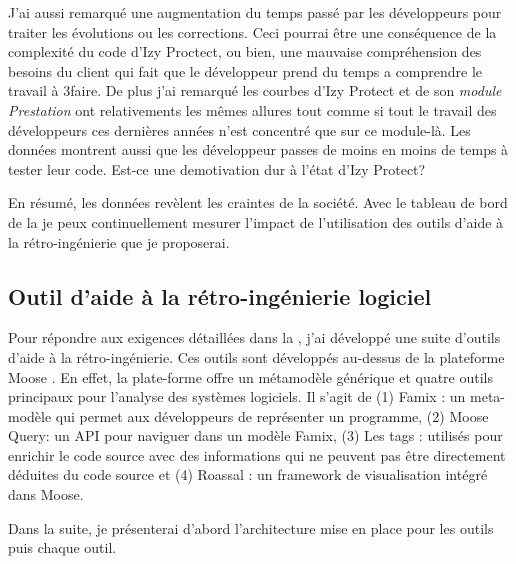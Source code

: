 \documentclass[a4paper]{article}
\begin{document}
J'ai aussi remarqué une augmentation du temps passé par les développeurs pour traiter les évolutions ou les corrections.
Ceci pourrai être une conséquence de la complexité du code d'Izy Proctect, ou bien, une mauvaise compréhension des besoins du client qui fait que le développeur prend du temps a comprendre le travail à 3faire.
De plus j'ai remarqué les courbes d'Izy Protect et de  son \textit{module Prestation} ont relativements les mêmes allures tout comme si tout le travail des développeurs ces dernières années n'est concentré que sur ce module-là.  
Les données montrent aussi que les développeur passes de moins en moins de temps à tester leur code. Est-ce une demotivation dur à l'état d'Izy Protect?

En résumé, les données revèlent les craintes de la société.
Avec le tableau de bord de la  je peux continuellement mesurer l'impact de l'utilisation des outils d'aide à la rétro-ingénierie que je proposerai.

\subsection{Outil d'aide à la rétro-ingénierie logiciel}

Pour répondre aux exigences détaillées dans la  , j'ai développé une suite d'outils d'aide à la rétro-ingénierie.
Ces outils sont développés au-dessus de la plateforme Moose \cite{Nier05c}.
En effet, la plate-forme offre un métamodèle générique et quatre outils principaux pour l'analyse des systèmes logiciels.
Il s'agit de (1) Famix : un meta-modèle qui permet aux développeurs de représenter un programme, (2) Moose Query: un API pour naviguer dans un modèle Famix,
(3) Les tags : utilisés pour enrichir le code source avec des informations qui ne peuvent pas être directement déduites du code source et 
(4) Roassal : un framework de visualisation intégré dans Moose.

Dans la suite, je présenterai d'abord l'architecture mise en place pour les outils puis chaque outil.
\end{document}
